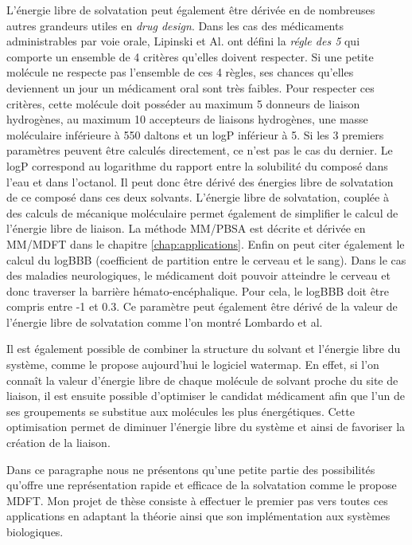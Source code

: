 L'énergie libre de solvatation peut également être dérivée en de nombreuses autres grandeurs utiles en \textit{drug design}. Dans les cas des médicaments administrables par voie orale, Lipinski et Al.\cite{Lipinski_lead_2004} ont défini la \textit{régle des 5} qui comporte un ensemble de 4 critères qu'elles doivent respecter. Si une petite molécule ne respecte pas l'ensemble de ces 4 règles, ses chances qu'elles deviennent un jour un médicament oral sont très faibles. Pour respecter ces critères, cette molécule doit posséder au maximum 5 donneurs de liaison hydrogènes, au maximum 10 accepteurs de liaisons hydrogènes, une masse moléculaire inférieure à 550 daltons et un logP inférieur à 5. Si les 3 premiers paramètres peuvent être calculés directement, ce n'est pas le cas du dernier. Le logP correspond au logarithme du rapport entre la solubilité du composé dans l'eau et dans l'octanol. Il peut donc être dérivé des énergies libre de solvatation de ce composé dans ces deux solvants. L'énergie libre de solvatation, couplée à des calculs de mécanique moléculaire permet également de simplifier le calcul de l'énergie libre de liaison. La méthode MM/PBSA\cite{genheden_mm/pbsa_2015} est décrite et dérivée en MM/MDFT dans le chapitre \ref{chap:applications}. Enfin on peut citer également le calcul du logBBB (coefficient de partition entre le cerveau et le sang). Dans le cas des maladies neurologiques, le médicament doit pouvoir atteindre le cerveau et donc traverser la barrière hémato-encéphalique. Pour cela, le logBBB doit être compris entre -1 et 0.3\cite{Vilar_prediction_2010}. Ce paramètre peut également être dérivé de la valeur de l'énergie libre de solvatation comme l'on montré Lombardo et al\cite{Lombardo_computation_1996}.

Il est également possible de combiner la structure du solvant et l'énergie libre du système, comme le propose aujourd'hui le logiciel watermap\cite{abel_role_2008,Young_motifs_2007}. En effet, si l'on connaît la valeur d'énergie libre de chaque molécule de solvant proche du site de liaison, il est ensuite possible d'optimiser le candidat médicament afin que l'un de ses groupements se substitue aux molécules les plus énergétiques. Cette optimisation permet de diminuer l'énergie libre du système et ainsi de favoriser la création de la liaison. 

Dans ce paragraphe nous ne présentons qu'une petite partie des possibilités qu'offre une représentation rapide et efficace de la solvatation comme le propose MDFT. Mon projet de thèse consiste à effectuer le premier pas vers toutes ces applications en adaptant la théorie ainsi que son implémentation aux systèmes biologiques.




\vspace{8\baselineskip}





